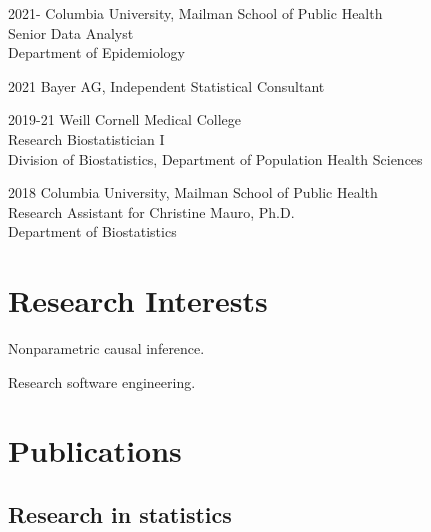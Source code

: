 \documentclass[12pt,letterpaper]{report}
\newcommand{\listitemspace}{0.15em}
\renewenvironment{itemize}
{\begin{list}{}{\setlength{\leftmargin}{0em}
            \setlength{\parskip}{0em}
            \setlength{\itemsep}{\listitemspace}
            \setlength{\parsep}{\listitemspace}}}
    {\end{list}}
\begin{document}
    \begin{tablist}
    
    	\item[2021-] \tab Columbia University, Mailman School of Public Health \\
						  Senior Data Analyst \\
						  Department of Epidemiology
						  
		\item[2021] \tab Bayer AG, Independent Statistical Consultant

        \item[2019-21] \tab Weill Cornell Medical College \\
                            Research Biostatistician I  \\
                            Division of Biostatistics, Department of Population Health Sciences 
        
        \item[2018]  \tab Columbia University, Mailman School of Public Health \\
                          Research Assistant for Christine Mauro, Ph.D. \\
                          Department of Biostatistics

    \end{tablist}

    \section*{Research Interests}

    \begin{itemize}

        \item Nonparametric causal inference.

        \item Research software engineering.

    \end{itemize}

    \section*{Publications}
    
    \subsection*{Research in statistics}
    
\end{document}
